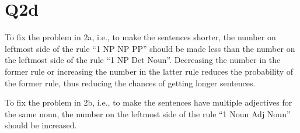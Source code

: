 \documentclass[12pt]{article}
\begin{document}
\section*{Q2d}
To fix the problem in 2a, i.e., to make the sentences shorter, the number on leftmost side of the rule “1 \hspace{1cm} NP\hspace{1cm} NP PP” should be made less than the number on the leftmost side of the rule “1\hspace{1cm} NP\hspace{1cm} Det Noun”. Decreasing the number in the former rule or increasing the number in the latter rule reduces the probability of the former rule, thus reducing the chances of getting longer sentences. 

To fix the problem in 2b, i.e., to make the sentences have multiple adjectives for the same noun, the number on the leftmost side of the rule “1\hspace{1cm} Noun\hspace{1cm} Adj Noun” should be increased.
\pagebreak
\end{document}
